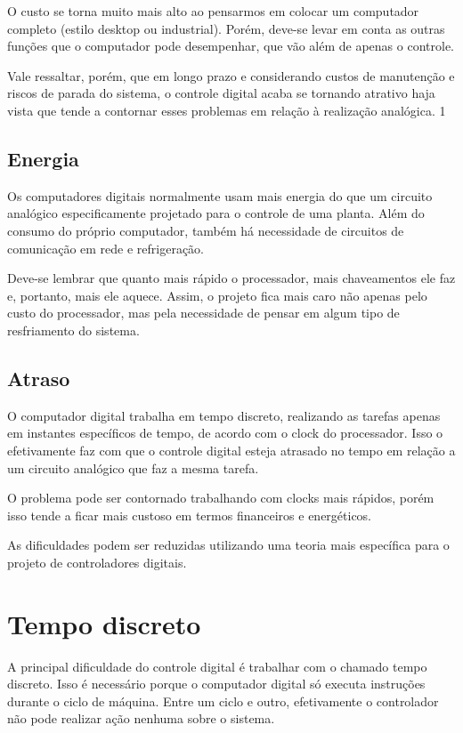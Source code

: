 \documentclass[12pt, a4paper]{article}
\begin{document}
O custo se torna muito mais alto ao pensarmos em colocar um computador completo (estilo desktop ou industrial). Porém, deve-se levar em conta as outras funções que o computador pode desempenhar, que vão além de apenas o controle. 

Vale ressaltar, porém, que em longo prazo e considerando custos de manutenção e riscos de parada do sistema, o controle digital acaba se tornando atrativo haja vista que tende a contornar esses problemas em relação à realização analógica. 1

\subsection{Energia}

Os computadores digitais normalmente usam mais energia do que um circuito analógico especificamente projetado para o controle de uma planta. Além do consumo do próprio computador, também há necessidade de circuitos de comunicação em rede e refrigeração.

Deve-se lembrar que quanto mais rápido o processador, mais chaveamentos ele faz e, portanto, mais ele aquece. Assim, o projeto fica mais caro não apenas pelo custo do processador, mas pela necessidade de pensar em algum tipo de resfriamento do sistema.  

\subsection{Atraso}

O computador digital trabalha em tempo discreto, realizando as tarefas apenas em instantes específicos de tempo, de acordo com o clock do processador. Isso o efetivamente faz com que o controle digital esteja atrasado no tempo em relação a um circuito analógico que faz a mesma tarefa. 

O problema pode ser contornado trabalhando com clocks mais rápidos, porém isso tende a ficar mais custoso em termos financeiros e energéticos.

As dificuldades podem ser reduzidas utilizando uma teoria mais específica para o projeto de controladores digitais. 

\section{Tempo discreto}

A principal dificuldade do controle digital é trabalhar com o chamado tempo discreto. Isso é necessário porque o computador digital só executa instruções durante o ciclo de máquina. Entre um ciclo e outro, efetivamente o controlador não pode realizar ação nenhuma sobre o sistema.
\end{document}
